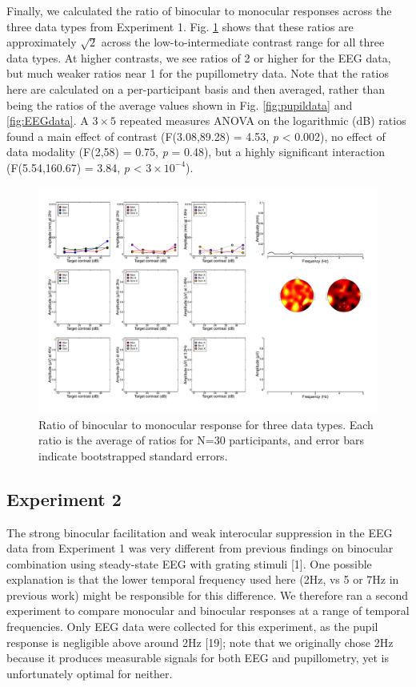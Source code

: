 \documentclass[
]{article}
\begin{document}
Finally, we calculated the ratio of binocular to monocular responses across the three data types from Experiment 1. Fig. \ref{fig:BSratios} shows that these ratios are approximately \(\sqrt2\) across the low-to-intermediate contrast range for all three data types. At higher contrasts, we see ratios of 2 or higher for the EEG data, but much weaker ratios near 1 for the pupillometry data. Note that the ratios here are calculated on a per-participant basis and then averaged, rather than being the ratios of the average values shown in Fig. \ref{fig:pupildata} and \ref{fig:EEGdata}. A \(3 \times 5\) repeated measures ANOVA on the logarithmic (dB) ratios found a main effect of contrast (F(3.08,89.28) = 4.53, \emph{p} \textless{} 0.002), no effect of data modality (F(2,58) = 0.75, \emph{p} = 0.48), but a highly significant interaction (F(5.54,160.67) = 3.84, \emph{p} \textless{} \ensuremath{3\times 10^{-4}}).

\begin{figure}

{\centering \includegraphics[width=0.5\linewidth]{Figures/blank} 

}

\caption{Ratio of binocular to monocular response for three data types. Each ratio is the average of ratios for N=30 participants, and error bars indicate bootstrapped standard errors.}\label{fig:BSratios}
\end{figure}

\hypertarget{experiment-2}{%
\subsection{Experiment 2}\label{experiment-2}}

The strong binocular facilitation and weak interocular suppression in the EEG data from Experiment 1 was very different from previous findings on binocular combination using steady-state EEG with grating stimuli {[}1{]}. One possible explanation is that the lower temporal frequency used here (2Hz, vs 5 or 7Hz in previous work) might be responsible for this difference. We therefore ran a second experiment to compare monocular and binocular responses at a range of temporal frequencies. Only EEG data were collected for this experiment, as the pupil response is negligible above around 2Hz {[}19{]}; note that we originally chose 2Hz because it produces measurable signals for both EEG and pupillometry, yet is unfortunately optimal for neither.
\end{document}
